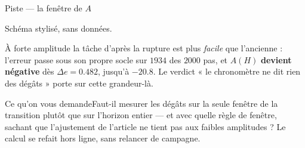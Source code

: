 \documentclass[aspectratio=169,11pt]{beamer}
\newcommand{\question}[1]{%
  \begin{block}{\footnotesize Ce qu'on vous demande}\footnotesize #1\end{block}}
\begin{document}
\begin{frame}{\hfill Piste --- la fenêtre de $A$}
  \vspace{-0.3em}
  \begin{center}
    \scalebox{0.74}{\schemaAire}
  \end{center}
  \vspace{-0.8em}
  \begin{center}\tiny\color{gray}Schéma stylisé, sans données.\end{center}

  \vspace{-0.1em}
  \footnotesize
  À forte amplitude la tâche d'après la rupture est plus \emph{facile} que
  l'ancienne : l'erreur passe sous son propre socle sur $\num{1934}$ des $\num{2000}$
  pas, et $A(H)$ \textbf{devient négative} dès $\Delta e = \num{0.482}$, jusqu'à
  $-\num{20.8}$. Le verdict « le chronomètre ne dit rien des dégâts » porte sur
  cette grandeur-là.

  \vspace{-0.2em}
  \question{Faut-il mesurer les dégâts sur la seule fenêtre de la transition
  plutôt que sur l'horizon entier --- et avec quelle règle de fenêtre, sachant
  que l'ajustement de l'article ne tient pas aux faibles amplitudes ? Le calcul
  se refait hors ligne, sans relancer de campagne.}
\end{frame}
\end{document}
